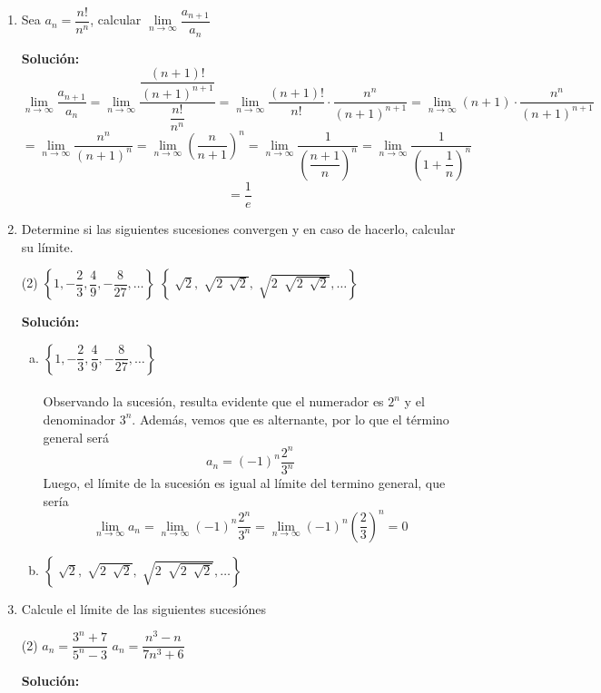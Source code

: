 \documentclass[12pt]{article}
\newenvironment{solucion}
{\begin{mdframed}[backgroundcolor=black!10]
		{\bf Solución:}\\
	}
	{
	\end{mdframed}
}
\newenvironment{preguntas}
{\begin{enumerate}\itemsep12pt
	}
	{
	\end{enumerate}
}
\newcommand{\ra}{\rightarrow}
\begin{document}
\begin{preguntas}
\item Sea $a_n = \dfrac{n!}{n^n}$, calcular $\lim\limits_{n \ra \infty} \dfrac{a_{n+1}}{a_n}$
\begin{solucion}
$$\lim\limits_{n \ra \infty} \dfrac{a_{n+1}}{a_n} = \lim\limits_{n \ra \infty} \dfrac{\dfrac{(n+1)!}{(n+1)^{n+1}}}{\dfrac{n!}{n^n}} = \lim\limits_{n \ra \infty} \dfrac{(n+1)!}{n!} \cdot \dfrac{n^n}{(n+1)^{n+1}} =\lim\limits_{n \ra \infty} (n+1) \cdot \dfrac{n^n}{(n+1)^{n+1}}$$
		$$=\lim\limits_{n \ra \infty} \dfrac{n^n}{(n+1)^{n}} = \lim\limits_{n \ra \infty} \left(\dfrac{n}{n+1}\right)^n = \lim\limits_{n \ra \infty} \dfrac{1}{\left(\dfrac{n+1}{n}\right)^n} = \lim\limits_{n \ra \infty} \dfrac{1}{\left(1+\dfrac{1}{n}\right)^n}$$
		$$ = \dfrac{1}{e}$$
\end{solucion}
\item Determine si las siguientes sucesiones convergen y en caso de hacerlo, calcular su límite.
\begin{tasks}(2)
\task $\left\{1, -\dfrac{2}{3}, \dfrac{4}{9}, -\dfrac{8}{27}, \dots \right\}$
\task $\left\{\sqrt[]{2}, \sqrt[]{2\ \sqrt[]{2}}, \sqrt[]{2\ \sqrt[]{2\ \sqrt[]{2}}}, \dots \right\}$
\end{tasks}
\begin{solucion}

\begin{enumerate}[a)]
\item $\left\{1, -\dfrac{2}{3}, \dfrac{4}{9}, -\dfrac{8}{27}, \dots \right\}$\\
			\\
			Observando la sucesión, resulta evidente que el numerador es $2^n$ y el\\ denominador $3^n$. Además, vemos que es alternante, por lo que el término general será
			$$a_n = (-1)^n \dfrac{2^{n}}{3^{n}}$$
			Luego, el límite de la sucesión es igual al límite del termino general, que sería
			$$\lim\limits_{n\ra \infty} a_n = \lim\limits_{n\ra \infty} (-1)^n \dfrac{2^{n}}{3^{n}} = 
			\lim\limits_{n\ra \infty} (-1)^n \left(\dfrac{2}{3}\right)^n = 0$$
\item $\left\{\sqrt[]{2}, \sqrt[]{2\ \sqrt[]{2}}, \sqrt[]{2\ \sqrt[]{2\ \sqrt[]{2}}}, \dots \right\}$
\end{enumerate}
\end{solucion}
\item Calcule el límite de las siguientes sucesiónes
\begin{tasks}(2)
\task $a_n = \dfrac{3^n+7}{5^n-3}$
\task $a_n = \dfrac{n^3-n}{7n^3+6}$
\end{tasks}
\begin{solucion}


\end{solucion}
\end{preguntas}
\end{document}
